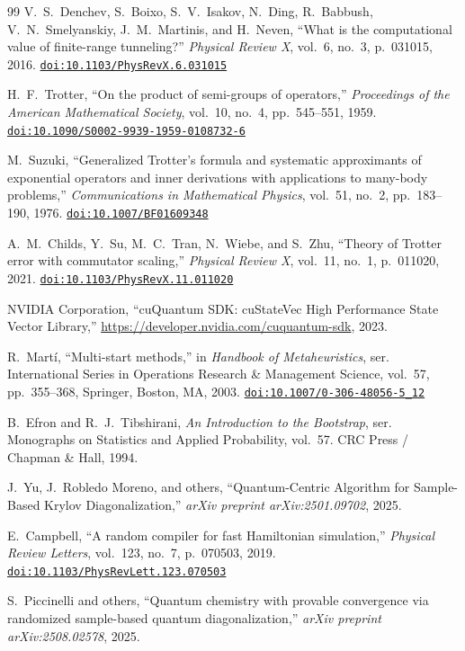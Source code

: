 \documentclass[10pt,twocolumn,a4paper]{article}
\providecommand{\doi}[1]{\href{https://doi.org/#1}{\nolinkurl{doi:#1}}}
\begin{document}
\begin{thebibliography}{99}
V.~S.~Denchev, S.~Boixo, S.~V.~Isakov, N.~Ding, R.~Babbush, V.~N.~Smelyanskiy, J.~M.~Martinis, and H.~Neven,
``What is the computational value of finite-range tunneling?''
\emph{Physical Review X}, vol.~6, no.~3, p.~031015, 2016.
\doi{10.1103/PhysRevX.6.031015}

H.~F.~Trotter,
``On the product of semi-groups of operators,''
\emph{Proceedings of the American Mathematical Society}, vol.~10, no.~4, pp.~545--551, 1959.
\doi{10.1090/S0002-9939-1959-0108732-6}

M.~Suzuki,
``Generalized Trotter's formula and systematic approximants of exponential operators and inner derivations with applications to many-body problems,''
\emph{Communications in Mathematical Physics}, vol.~51, no.~2, pp.~183--190, 1976.
\doi{10.1007/BF01609348}

A.~M.~Childs, Y.~Su, M.~C.~Tran, N.~Wiebe, and S.~Zhu,
``Theory of Trotter error with commutator scaling,''
\emph{Physical Review X}, vol.~11, no.~1, p.~011020, 2021.
\doi{10.1103/PhysRevX.11.011020}

{NVIDIA Corporation},
``cuQuantum SDK: cuStateVec High Performance State Vector Library,''
\url{https://developer.nvidia.com/cuquantum-sdk}, 2023.

R.~Mart{\'i},
``Multi-start methods,''
in \emph{Handbook of Metaheuristics}, ser. International Series in Operations Research \& Management Science, vol.~57, pp.~355--368, Springer, Boston, MA, 2003.
\doi{10.1007/0-306-48056-5_12}

B.~Efron and R.~J.~Tibshirani,
\emph{An Introduction to the Bootstrap},
ser. Monographs on Statistics and Applied Probability, vol.~57. CRC Press / Chapman \& Hall, 1994.

J.~Yu, J.~Robledo Moreno, and others,
``Quantum-Centric Algorithm for Sample-Based Krylov Diagonalization,''
\emph{arXiv preprint arXiv:2501.09702}, 2025.

E.~Campbell,
``A random compiler for fast Hamiltonian simulation,''
\emph{Physical Review Letters}, vol.~123, no.~7, p.~070503, 2019.
\doi{10.1103/PhysRevLett.123.070503}

S.~Piccinelli and others,
``Quantum chemistry with provable convergence via randomized sample-based quantum diagonalization,''
\emph{arXiv preprint arXiv:2508.02578}, 2025.

\end{thebibliography}
\end{document}
